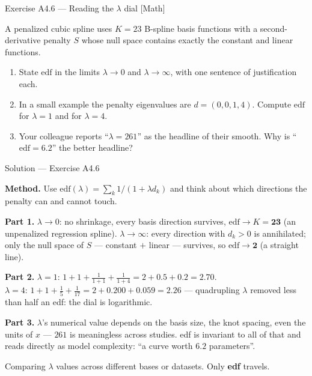\documentclass[aspectratio=169,11pt]{beamer}
\begin{document}
\begin{frame}{Exercise A4.6 --- Reading the $\lambda$ dial [Math]}
\begin{exercise}
  A penalized cubic spline uses $K = 23$ B-spline basis functions with a
  second-derivative penalty $S$ whose null space contains exactly the constant and
  linear functions.
  \begin{enumerate}
    \item State $\text{edf}$ in the limits $\lambda \to 0$ and $\lambda \to \infty$,
          with one sentence of justification each.
    \item In a small example the penalty eigenvalues are $d = (0, 0, 1, 4)$. Compute
          $\text{edf}$ for $\lambda = 1$ and for $\lambda = 4$.
    \item Your colleague reports ``$\lambda = 261$'' as the headline of their smooth.
          Why is ``$\text{edf} = 6.2$'' the better headline?
  \end{enumerate}
\end{exercise}
\end{frame}

\begin{frame}{Solution --- Exercise A4.6}
\begin{solutionbox}
  \textbf{Method.} Use $\text{edf}(\lambda) = \sum_k 1/(1+\lambda d_k)$ and think about
  which directions the penalty can and cannot touch.

  \textbf{Part 1.} $\lambda \to 0$: no shrinkage, every basis direction survives,
  $\text{edf} \to K = \mathbf{23}$ (an unpenalized regression spline).
  $\lambda \to \infty$: every direction with $d_k > 0$ is annihilated; only the
  null space of $S$ --- constant $+$ linear --- survives, so
  $\text{edf} \to \mathbf{2}$ (a straight line).

  \textbf{Part 2.} $\lambda = 1$:
  $1 + 1 + \tfrac{1}{1+1} + \tfrac{1}{1+4} = 2 + 0.5 + 0.2 = \mathbf{2.70}$.\\
  $\lambda = 4$:
  $1 + 1 + \tfrac{1}{5} + \tfrac{1}{17} = 2 + 0.200 + 0.059 = \mathbf{2.26}$ ---
  quadrupling $\lambda$ removed less than half an edf: the dial is logarithmic.

  \textbf{Part 3.} $\lambda$'s numerical value depends on the basis size, the knot
  spacing, even the units of $x$ --- $261$ is meaningless across studies. edf is
  invariant to all of that and reads directly as model complexity:
  ``a curve worth $6.2$ parameters''.
\end{solutionbox}
\begin{mistake}
  Comparing $\lambda$ values across different bases or datasets. Only \textbf{edf}
  travels.
\end{mistake}
\end{frame}
\end{document}
